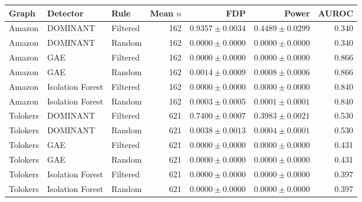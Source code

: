 \begin{tabular}{lllrrrr}\toprule
Graph & Detector & Rule & Mean $n$ & FDP & Power & AUROC\\\midrule
Amazon & DOMINANT & Filtered & 162 & $0.9357\pm0.0034$ & $0.4489\pm0.0299$ & 0.340 \\
Amazon & DOMINANT & Random & 162 & $0.0000\pm0.0000$ & $0.0000\pm0.0000$ & 0.340 \\
Amazon & GAE & Filtered & 162 & $0.0000\pm0.0000$ & $0.0000\pm0.0000$ & 0.866 \\
Amazon & GAE & Random & 162 & $0.0014\pm0.0009$ & $0.0008\pm0.0006$ & 0.866 \\
Amazon & Isolation Forest & Filtered & 162 & $0.0000\pm0.0000$ & $0.0000\pm0.0000$ & 0.840 \\
Amazon & Isolation Forest & Random & 162 & $0.0003\pm0.0005$ & $0.0001\pm0.0001$ & 0.840 \\
Tolokers & DOMINANT & Filtered & 621 & $0.7400\pm0.0007$ & $0.3983\pm0.0021$ & 0.530 \\
Tolokers & DOMINANT & Random & 621 & $0.0038\pm0.0013$ & $0.0004\pm0.0001$ & 0.530 \\
Tolokers & GAE & Filtered & 621 & $0.0000\pm0.0000$ & $0.0000\pm0.0000$ & 0.431 \\
Tolokers & GAE & Random & 621 & $0.0000\pm0.0000$ & $0.0000\pm0.0000$ & 0.431 \\
Tolokers & Isolation Forest & Filtered & 621 & $0.0000\pm0.0000$ & $0.0000\pm0.0000$ & 0.397 \\
Tolokers & Isolation Forest & Random & 621 & $0.0000\pm0.0000$ & $0.0000\pm0.0000$ & 0.397 \\
\bottomrule\end{tabular}
